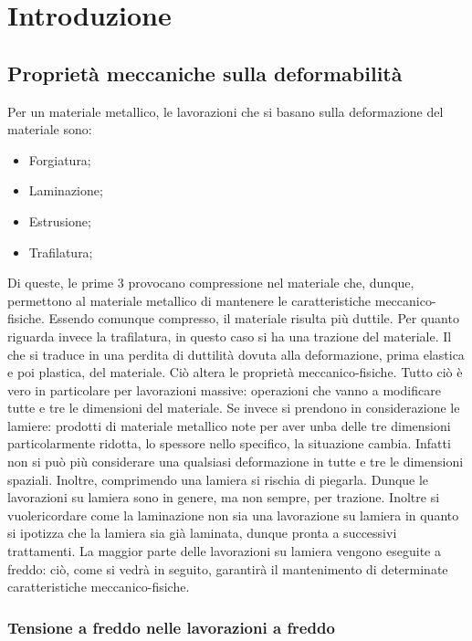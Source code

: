 \chapter{Introduzione}\label{chp:1}
\section{Proprietà meccaniche sulla deformabilità}
Per un materiale metallico, le lavorazioni che si basano sulla deformazione del materiale sono:
\begin{itemize}
\item Forgiatura;
\item Laminazione;
\item Estrusione;
\item Trafilatura;
\end{itemize}
Di queste, le prime 3 provocano compressione nel materiale che, dunque, permettono al materiale metallico di mantenere le caratteristiche meccanico-fisiche. Essendo comunque compresso, il materiale risulta più duttile.
Per quanto riguarda invece la trafilatura, in questo caso si ha una trazione del materiale. Il che si traduce in una perdita di duttilità dovuta alla deformazione, prima elastica e poi plastica, del materiale. Ciò altera le proprietà meccanico-fisiche.
Tutto ciò è vero in particolare per lavorazioni massive: operazioni che vanno a modificare tutte e tre le dimensioni del materiale.
\newline
Se invece si prendono in considerazione le lamiere: prodotti di materiale metallico note per aver unba delle tre dimensioni particolarmente ridotta, lo spessore nello specifico, la situazione cambia. Infatti non si può più considerare una qualsiasi deformazione in tutte e tre le dimensioni spaziali.
Inoltre, comprimendo una lamiera si rischia di piegarla. Dunque le lavorazioni su lamiera sono in genere, ma non sempre, per trazione.
Inoltre si vuolericordare come la laminazione non sia una lavorazione su lamiera in quanto si ipotizza che la lamiera sia già laminata, dunque pronta a successivi trattamenti.
La maggior parte delle lavorazioni su lamiera vengono eseguite a freddo: ciò, come si vedrà in seguito, garantirà il mantenimento di determinate caratteristiche meccanico-fisiche.

\subsection{Tensione a freddo nelle lavorazioni a freddo}


